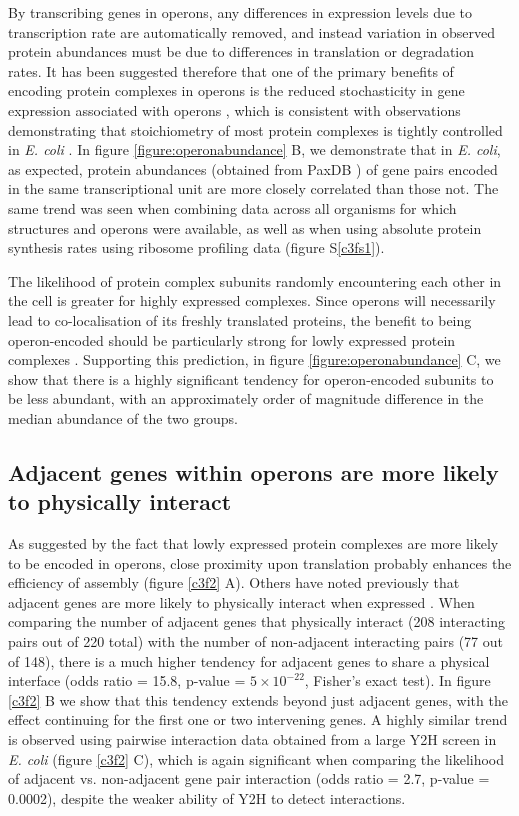 \documentclass[a4paper,11pt,twoside,openright]{scrbook}
\begin{document}
By transcribing genes in operons, any differences in expression levels due to transcription rate are automatically removed, and instead variation in observed protein abundances must be due to differences in translation or degradation rates. It has been suggested therefore that one of the primary benefits of encoding protein complexes in operons is the reduced stochasticity in gene expression associated with operons \cite{Swain2004,Sneppen2010,Shieh2015a}, which is consistent with observations demonstrating that stoichiometry of most protein complexes is tightly controlled in \textit{E. coli} \cite{Li2014b}. In figure \ref{figure:operonabundance} B, we demonstrate that in \textit{E. coli}, as expected, protein abundances (obtained from PaxDB \cite{Wang2015}) of gene pairs encoded in the same transcriptional unit are more closely correlated than those not. The same trend was seen when combining data across all organisms for which structures and operons were available, as well as when using absolute protein synthesis rates using ribosome profiling data \cite{Li2014b} (figure S\ref{c3fs1}).

The likelihood of protein complex subunits randomly encountering each other in the cell is greater for highly expressed complexes. Since operons will necessarily lead to co-localisation of its freshly translated proteins, the benefit to being operon-encoded should be particularly strong for lowly expressed protein complexes \cite{Swain2002,Kovacs2009}. Supporting this prediction, in figure \ref{figure:operonabundance} C, we show that there is a highly significant tendency for operon-encoded subunits to be less abundant, with an approximately order of magnitude difference in the median abundance of the two groups.

\clearpage
\subsection{Adjacent genes within operons are more likely to physically interact}
As suggested by the fact that lowly expressed protein complexes are more likely to be encoded in operons, close proximity upon translation probably enhances the efficiency of assembly (figure \ref{c3f2} A). Others have noted previously that adjacent genes are more likely to physically interact when expressed \cite{}. When comparing the number of adjacent genes that physically interact (208 interacting pairs out of 220 total) with the number of non-adjacent interacting pairs (77 out of 148), there is a much higher tendency for adjacent genes to share a physical interface (odds ratio = 15.8, p-value = \(5\times10^{-22}\), Fisher's exact test). In figure \ref{c3f2} B we show that this tendency extends beyond just adjacent genes, with the effect continuing for the first one or two intervening genes. A highly similar trend is observed using pairwise interaction data obtained from a large Y2H screen in \textit{E. coli} \cite{Rajagopala2014} (figure \ref{c3f2} C), which is again significant when comparing the likelihood of adjacent vs. non-adjacent gene pair interaction (odds ratio = 2.7, p-value = 0.0002), despite the weaker ability of Y2H to detect interactions.
\end{document}
